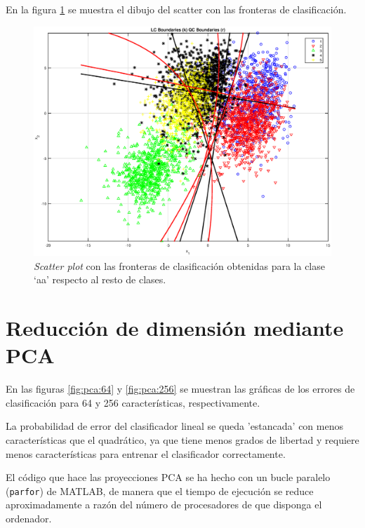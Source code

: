 \documentclass[11pt]{article} %
\begin{document}
En la figura \ref{fig:2c:22_64:scatter} se muestra el dibujo del scatter con las fronteras de clasificación.

\begin{figure}[h]
	\centering
	\includegraphics[width=\textwidth]{../2_comp/[22_64].eps}
	\caption[]{\small \emph{Scatter plot} con las fronteras de clasificación obtenidas para la clase ‘aa’ respecto al resto de clases.}
	\label{fig:2c:22_64:scatter}
\end{figure}

\clearpage

\section{Reducción de dimensión mediante PCA}

En las figuras \ref{fig:pca:64} y \ref{fig:pca:256} se muestran las gráficas de los errores de clasificación para 64 y 256 características, respectivamente.

La probabilidad de error del clasificador lineal se queda 'estancada' con menos características que el quadrático, ya que tiene menos grados de libertad y requiere menos características para entrenar el clasificador correctamente.

El código que hace las proyecciones PCA se ha hecho con un bucle paralelo (\texttt{parfor}) de MATLAB, de manera que el tiempo de ejecución se reduce aproximadamente a razón del número de procesadores de que disponga el ordenador.
\end{document}
